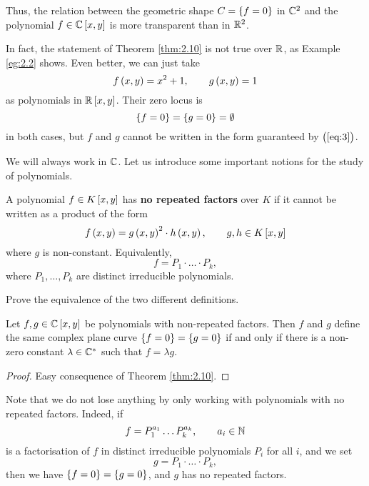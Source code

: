 Thus, the relation between the geometric shape $ C = \cbr{f = 0} $ in $ \mathbb{C}^2 $ and the polynomial $ f \in \C\sbr{x, y} $ is more transparent than in $ \mathbb{R}^2 $.

\begin{remark}
In fact, the statement of Theorem \ref{thm:2.10} is not true over $ \mathbb{R} $, as Example \ref{eg:2.2} shows. Even better, we can just take
$$ f\br{x, y} = x^2 + 1, \qquad g\br{x, y} = 1 $$
as polynomials in $ \R\sbr{x, y} $. Their zero locus is
$$ \cbr{f = 0} = \cbr{g = 0} = \emptyset $$
in both cases, but $ f $ and $ g $ cannot be written in the form guaranteed by $ \br{\ref{eq:3}} $.
\end{remark}

We will always work in $ \mathbb{C} $. Let us introduce some important notions for the study of polynomials.

\begin{definition}
A polynomial $ f \in K\sbr{x, y} $ has \textbf{no repeated factors} over $ K $ if it cannot be written as a product of the form
$$ f\br{x, y} = g\br{x, y}^2 \cdot h\br{x, y}, \qquad g, h \in K\sbr{x, y} $$
where $ g $ is non-constant. Equivalently,
$$ f = P_1 \cdot \dots \cdot P_k, $$
where $ P_1, \dots, P_k $ are distinct irreducible polynomials.
\end{definition}

\begin{exercise}
Prove the equivalence of the two different definitions.
\end{exercise}

\begin{corollary}
Let $ f, g \in \C\sbr{x, y} $ be polynomials with non-repeated factors. Then $ f $ and $ g $ define the same complex plane curve $ \cbr{f = 0} = \cbr{g = 0} $ if and only if there is a non-zero constant $ \lambda \in \mathbb{C}^* $ such that $ f = \lambda g $.
\end{corollary}

\begin{proof}
Easy consequence of Theorem \ref{thm:2.10}.
\end{proof}

\begin{remark}
Note that we do not lose anything by only working with polynomials with no repeated factors. Indeed, if
$$ f = P_1^{a_1} \dots P_k^{a_k}, \qquad a_i \in \mathbb{N} $$
is a factorisation of $ f $ in distinct irreducible polynomials $ P_i $ for all $ i $, and we set
$$ g = P_1 \cdot \dots \cdot P_k, $$
then we have $ \cbr{f = 0} = \cbr{g = 0} $, and $ g $ has no repeated factors.
\end{remark}

